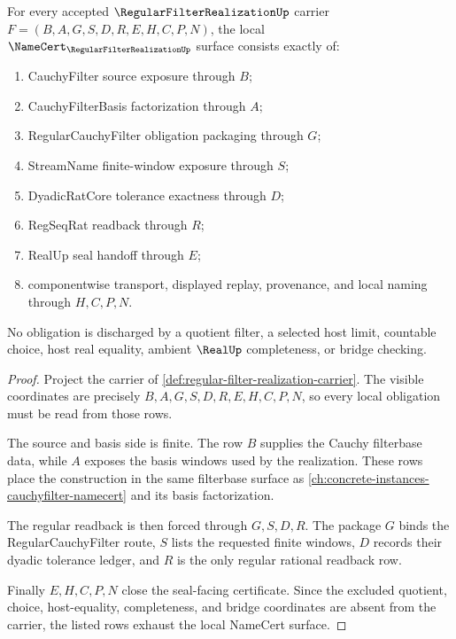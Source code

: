 \begin{theorem}
\label{thm:regular-filter-realization-namecert-obligations}
For every accepted $\RegularFilterRealizationUp$ carrier $F=(B,A,G,S,D,R,E,H,C,P,N)$, the local $\NameCert_{\RegularFilterRealizationUp}$ surface consists exactly of:
\begin{enumerate}
\item CauchyFilter source exposure through $B$;
\item CauchyFilterBasis factorization through $A$;
\item RegularCauchyFilter obligation packaging through $G$;
\item StreamName finite-window exposure through $S$;
\item DyadicRatCore tolerance exactness through $D$;
\item RegSeqRat readback through $R$;
\item RealUp seal handoff through $E$;
\item componentwise transport, displayed replay, provenance, and local naming through $H,C,P,N$.
\end{enumerate}
No obligation is discharged by a quotient filter, a selected host limit, countable choice, host real equality, ambient $\RealUp$ completeness, or bridge checking.
\end{theorem}
\begin{proof}
Project the carrier of \autoref{def:regular-filter-realization-carrier}. The visible coordinates are precisely $B,A,G,S,D,R,E,H,C,P,N$, so every local obligation must be read from those rows.

The source and basis side is finite. The row $B$ supplies the Cauchy filterbase data, while $A$ exposes the basis windows used by the realization. These rows place the construction in the same filterbase surface as \autoref{ch:concrete-instances-cauchyfilter-namecert} and its basis factorization.

The regular readback is then forced through $G,S,D,R$. The package $G$ binds the RegularCauchyFilter route, $S$ lists the requested finite windows, $D$ records their dyadic tolerance ledger, and $R$ is the only regular rational readback row.

Finally $E,H,C,P,N$ close the seal-facing certificate. Since the excluded quotient, choice, host-equality, completeness, and bridge coordinates are absent from the carrier, the listed rows exhaust the local NameCert surface.
\end{proof}

